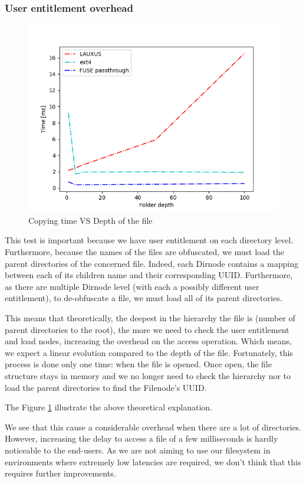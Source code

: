 \documentclass[../main.tex]{subfiles}
\begin{document}
\subsubsection{User entitlement overhead}
\label{section:analysis:user_entitlement_overhead}
\begin{figure}[h]
    \centering
    \includegraphics[width=.8\textwidth]{images/analysis/per_folder_depth}
    
    \caption{Copying time VS Depth of the file}
    \label{figure:analysis:perf_write_per_depth}
\end{figure}
\par This test is important because we have user entitlement on each directory level. Furthermore, because the names of the files are obfuscated, we must load the parent directories of the concerned file. Indeed, each Dirnode contains a mapping between each of its children name and their corresponding UUID. Furthermore, as there are multiple Dirnode level (with each a possibly different user entitlement), to de-obfuscate a file, we must load all of its parent directories.
\par This means that theoretically, the deepest in the hierarchy the file is (number of parent directories to the root), the more we need to check the user entitlement and load nodes, increasing the overhead on the access operation. Which means, we expect a linear evolution compared to the depth of the file. Fortunately, this process is done only one time: when the file is opened. Once open, the file structure stays in memory and we no longer need to check the hierarchy nor to load the parent directories to find the Filenode's UUID.
\par The Figure \ref{figure:analysis:perf_write_per_depth} illustrate the above theoretical explanation.
\par We see that this cause a considerable overhead when there are a lot of directories. However, increasing the delay to access a file of a few milliseconds is hardly noticeable to the end-users. As we are not aiming to use our filesystem in environments where extremely low latencies are required, we don't think that this requires further improvements.
\end{document}
